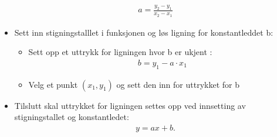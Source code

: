 \documentclass[12pt,twoside,onecolumn]{article}
\begin{document}
\begin{Exercise}
\begin{itemize}
\begin{align}
a =  \frac{y_2 - y_1}{x_2 - x_1}
\end{align}
\item Sett inn stigningstalllet i funksjonen og løs ligning for konstantleddet b:
\begin{itemize}
\item Sett opp et uttrykk for ligningen hvor b er ukjent :
\begin{align}
b = y_1 - a\cdot x_1
\end{align}
\item Velg et punkt $(x_1, y_1)$ og sett den inn for uttrykket for b
\end{itemize}
\item Tilslutt skal uttrykket for ligningen settes opp ved innsetting av stigningstallet og \mbox{konstantledet:}
\begin{align}
y = ax + b.
\end{align}
\end{itemize}
\end{Exercise}
\end{document}
